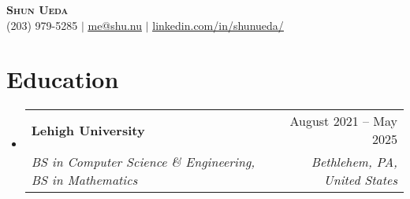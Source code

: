 \documentclass[letterpaper,12pt]{extarticle}
\makeatletter
\newcommand{\resumeSubheading}[4]{
  \vspace{-1pt}\item
    \begin{tabular*}{0.97\textwidth}[t]{l@{\extracolsep{\fill}}r}
      \textbf{#1} & \small #2 \\
      \textit{\small #3} & \textit{\small #4} \\
    \end{tabular*}\vspace{-7pt}
}
\newcommand{\resumeSubHeadingListStart}{\begin{itemize}[leftmargin=0.15in, label={}]}
\newcommand{\resumeSubHeadingListEnd}{\end{itemize}}
\makeatother
\begin{document}
\begin{center}
	\textbf{\Huge \scshape Shun Ueda} \\ \vspace{1pt}
	\small (203) 979-5285 $|$ \href{mailto:me@shu.nu}{\underline{me@shu.nu}} $|$
	\href{https://www.linkedin.com/in/shunueda/}{\underline{linkedin.com/in/shunueda/}}
\end{center}


\section{Education}
\resumeSubHeadingListStart
\resumeSubheading
{Lehigh University}{August 2021 -- May 2025}
{BS in Computer Science \& Engineering, BS in Mathematics}{Bethlehem, PA, United States}
\resumeSubHeadingListEnd

\end{document}
